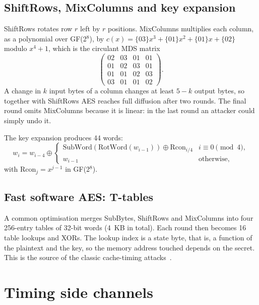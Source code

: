 \subsection{ShiftRows, MixColumns and key expansion}

ShiftRows rotates row $r$ left by $r$ positions. MixColumns multiplies each column, as a polynomial over GF(2$^8$), by $c(x) = \{03\}x^3 + \{01\}x^2 + \{01\}x + \{02\}$ modulo $x^4+1$, which is the circulant MDS matrix
\begin{equation}
\begin{pmatrix} 02 & 03 & 01 & 01 \\ 01 & 02 & 03 & 01 \\ 01 & 01 & 02 & 03 \\ 03 & 01 & 01 & 02 \end{pmatrix}.
\end{equation}
A change in $k$ input bytes of a column changes at least $5-k$ output bytes, so together with ShiftRows AES reaches full diffusion after two rounds. The final round omits MixColumns because it is linear: in the last round an attacker could simply undo it.

The key expansion produces 44 words:
\begin{equation}
w_i = w_{i-4} \oplus \begin{cases} \mathrm{SubWord}(\mathrm{RotWord}(w_{i-1})) \oplus \mathrm{Rcon}_{i/4} & i \equiv 0 \pmod 4,\\ w_{i-1} & \text{otherwise,}\end{cases}
\end{equation}
with $\mathrm{Rcon}_j = x^{j-1}$ in GF(2$^8$).

\subsection{Fast software AES: T-tables}

A common optimisation merges SubBytes, ShiftRows and MixColumns into four 256-entry tables of 32-bit words (4~KB in total). Each round then becomes 16 table lookups and XORs. The lookup index is a state byte, that is, a function of the plaintext and the key, so the memory address touched depends on the secret. This is the source of the classic cache-timing attacks~\cite{bernstein05,osvik06}.

\section{Timing side channels}

